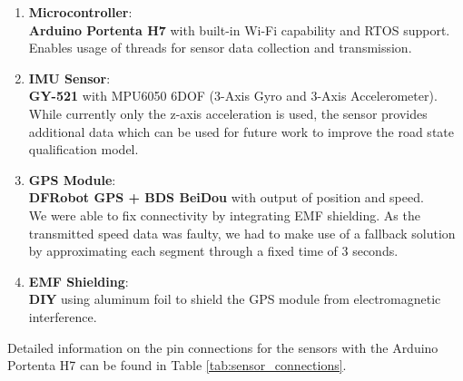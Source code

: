 \begin{enumerate}
    \item \textbf{Microcontroller}: \\
        \textbf{Arduino Portenta H7} with built-in Wi-Fi capability and RTOS support. \\
        Enables usage of threads for sensor data collection and transmission.
    \item \textbf{IMU Sensor}: \\
        \textbf{GY-521} with MPU6050 6DOF (3-Axis Gyro and 3-Axis Accelerometer). \\
        While currently only the z-axis acceleration is used, the sensor provides additional data which can be used for future work to improve the road state qualification model.
    \item \textbf{GPS Module}: \\
        \textbf{DFRobot GPS + BDS BeiDou} with output of position and speed. \\
        We were able to fix connectivity by integrating EMF shielding. As the transmitted speed data was faulty, we had to make use of a fallback solution by approximating each segment through a fixed time of 3 seconds.
    \item \textbf{EMF Shielding}: \\
        \textbf{DIY} using aluminum foil to shield the GPS module from electromagnetic interference.

\end{enumerate}

Detailed information on the pin connections for the sensors with the Arduino Portenta H7 can be found in Table \ref{tab:sensor_connections}.

